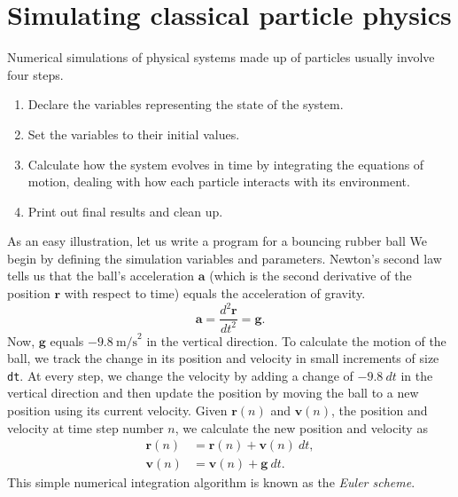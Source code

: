 \section*{\label{basic_simulation}Simulating classical particle physics}

Numerical simulations of physical systems made up of particles usually involve
four steps.
\begin{enumerate}
  \item Declare the variables representing the state of the system.
  \item Set the variables to their initial values.
  \item Calculate how the system evolves in time by integrating the
        equations of motion, dealing with how each particle interacts with its
        environment.
  \item Print out final results and clean up.
\end{enumerate}

As an easy illustration, let us write a program for a bouncing rubber ball We 
begin by defining the simulation variables and parameters. Newton's second law 
tells us that the ball's acceleration $\mathbf{a}$ (which is the second 
derivative of the position $\mathbf{r}$ with respect to time) equals the 
acceleration of gravity.
\begin{equation*}
  \mathbf{a} = \frac{d^2\mathbf{r}}{dt^2} = \mathbf{g}.
\end{equation*}
Now, $\mathbf{g}$ equals $-9.8\ \mathrm{m/s}^2$ in the vertical direction. To
calculate the motion of the ball, we track the change in its position and
velocity in small increments of size \texttt{dt}. At every step, we change the
velocity by adding a change of $-9.8\ dt$ in the vertical direction and then
update the position by moving the ball to a new position using its current
velocity. Given $\mathbf{r}(n)$ and $\mathbf{v}(n)$, the position and velocity
at time step number $n$, we calculate the new position and velocity as
\begin{align*}
  \mathbf{r}(n) & = \mathbf{r}(n) + \mathbf{v}(n)\ dt, \\
  \mathbf{v}(n) & = \mathbf{v}(n) + \mathbf{g}\ dt.
\end{align*}
This simple numerical integration algorithm is known as the \textit{Euler
scheme}.

